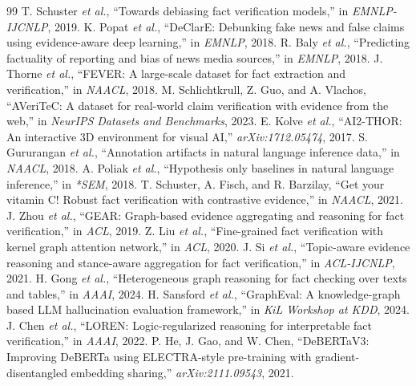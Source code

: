 \documentclass[conference]{IEEEtran}
\begin{document}
\begin{thebibliography}{99}
 T. Schuster \textit{et al.}, ``Towards debiasing fact verification models,'' in \textit{EMNLP-IJCNLP}, 2019.
 K. Popat \textit{et al.}, ``DeClarE: Debunking fake news and false claims using evidence-aware deep learning,'' in \textit{EMNLP}, 2018.
 R. Baly \textit{et al.}, ``Predicting factuality of reporting and bias of news media sources,'' in \textit{EMNLP}, 2018.
 J. Thorne \textit{et al.}, ``FEVER: A large-scale dataset for fact extraction and verification,'' in \textit{NAACL}, 2018.
 M. Schlichtkrull, Z. Guo, and A. Vlachos, ``AVeriTeC: A dataset for real-world claim verification with evidence from the web,'' in \textit{NeurIPS Datasets and Benchmarks}, 2023.
 E. Kolve \textit{et al.}, ``AI2-THOR: An interactive 3D environment for visual AI,'' \textit{arXiv:1712.05474}, 2017.
 S. Gururangan \textit{et al.}, ``Annotation artifacts in natural language inference data,'' in \textit{NAACL}, 2018.
 A. Poliak \textit{et al.}, ``Hypothesis only baselines in natural language inference,'' in \textit{*SEM}, 2018.
 T. Schuster, A. Fisch, and R. Barzilay, ``Get your vitamin C! Robust fact verification with contrastive evidence,'' in \textit{NAACL}, 2021.
 J. Zhou \textit{et al.}, ``GEAR: Graph-based evidence aggregating and reasoning for fact verification,'' in \textit{ACL}, 2019.
 Z. Liu \textit{et al.}, ``Fine-grained fact verification with kernel graph attention network,'' in \textit{ACL}, 2020.
 J. Si \textit{et al.}, ``Topic-aware evidence reasoning and stance-aware aggregation for fact verification,'' in \textit{ACL-IJCNLP}, 2021.
 H. Gong \textit{et al.}, ``Heterogeneous graph reasoning for fact checking over texts and tables,'' in \textit{AAAI}, 2024.
 H. Sansford \textit{et al.}, ``GraphEval: A knowledge-graph based LLM hallucination evaluation framework,'' in \textit{KiL Workshop at KDD}, 2024.
 J. Chen \textit{et al.}, ``LOREN: Logic-regularized reasoning for interpretable fact verification,'' in \textit{AAAI}, 2022.
 P. He, J. Gao, and W. Chen, ``DeBERTaV3: Improving DeBERTa using ELECTRA-style pre-training with gradient-disentangled embedding sharing,'' \textit{arXiv:2111.09543}, 2021.

\end{thebibliography}
\end{document}
